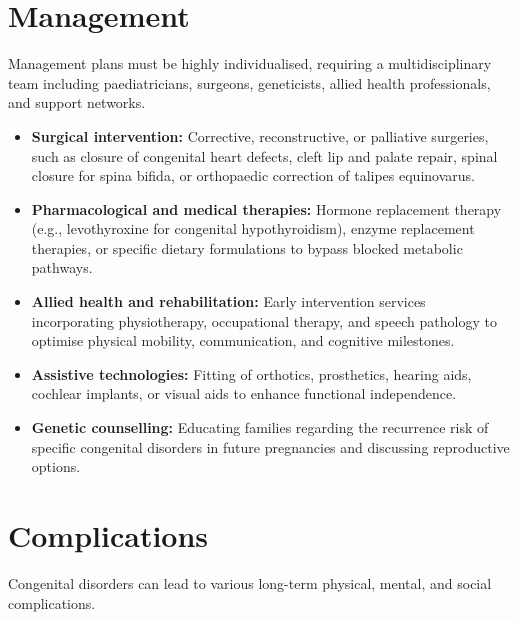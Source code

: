 \section*{Management}
Management plans must be highly individualised, requiring a multidisciplinary team including paediatricians, surgeons, geneticists, allied health professionals, and support networks.

\begin{itemize}
    \item \textbf{Surgical intervention:} Corrective, reconstructive, or palliative surgeries, such as closure of congenital heart defects, cleft lip and palate repair, spinal closure for spina bifida, or orthopaedic correction of talipes equinovarus.
    \item \textbf{Pharmacological and medical therapies:} Hormone replacement therapy (e.g., levothyroxine for congenital hypothyroidism), enzyme replacement therapies, or specific dietary formulations to bypass blocked metabolic pathways.
    \item \textbf{Allied health and rehabilitation:} Early intervention services incorporating physiotherapy, occupational therapy, and speech pathology to optimise physical mobility, communication, and cognitive milestones.
    \item \textbf{Assistive technologies:} Fitting of orthotics, prosthetics, hearing aids, cochlear implants, or visual aids to enhance functional independence.
    \item \textbf{Genetic counselling:} Educating families regarding the recurrence risk of specific congenital disorders in future pregnancies and discussing reproductive options.
\end{itemize}

\section*{Complications}
Congenital disorders can lead to various long-term physical, mental, and social complications.

